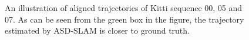 \documentclass[letterpaper, 10 pt, conference]{ieeeconf}  %
\begin{document}
\begin{figure}[H]
\flushleft 
{}%
%

%
%

\caption{An illustration of  aligned trajectories of Kitti sequence 00, 05 and 07. As can be seen from the green box in the figure, the trajectory estimated by ASD-SLAM is closer to ground truth.} 
\end{figure}
\end{document}

